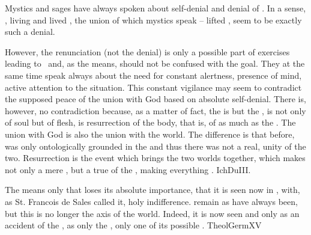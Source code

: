 \pa Mystics and sages have always spoken about self-denial and denial of
.  In a sense, , living and lived ,
the union of which mystics speak -- lifted , seem to be
exactly such a denial.

However, the renunciation (not the denial) is only a possible part of
 exercises leading to \yes\ and, as the means, should not be
confused with the goal.  They at the same time speak always about the need for
constant alertness, presence of mind, active attention to the 
situation.  This constant vigilance may seem to contradict the supposed peace of
the union with God based on absolute self-denial.  There is, however, no
contradiction because, as a matter of fact, the  is but the , is  not only of soul but of flesh, is resurrection of
the body, that is, of  as much as the .  The union
with God is also the union with the world.  The difference is that before,
 was only ontologically grounded in the  and thus
there was not a real,  unity of the two.  Resurrection is the
 event which brings the two worlds together, which makes
 not only a mere , but a true 
of the , making everything .
\citet{The strongest and deepest reality is where everything is included in the
  activity, the complete man without any reserve and the all-embracing God, the
  unitary self and the unlimited thou.}{IchDu}{III. }

\pa The  means only that  loses its
absolute importance, that it is seen now in  , with, as St.  Francois de Sales called it, {holy indifference}.
 remain  as  have always been, but this  is
no longer the axis of the world.  Indeed, it is now seen and 
only as an accident of the , as only the , only one of its
possible .  \citet{[A] man should so stand free, being quit of
  himself, that is, of his I, and Me, and Self, and Mine, and the like, that in
  all things, he should no more seek or regard himself, than if he did not
  exist, and should take as little account of himself as if he were not, and
  another had done all his works.  Likewise he should count all the creatures
  for nothing.}{TheolGerm}{XV}

